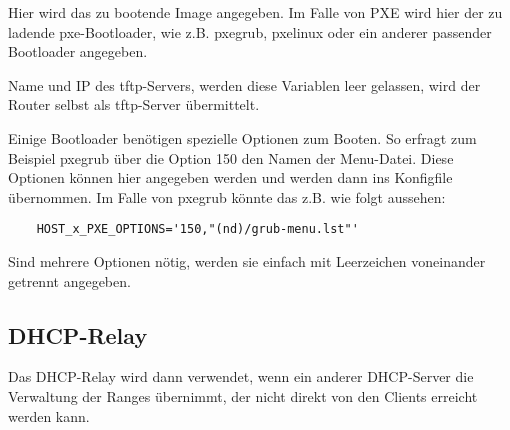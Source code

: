   \begin{description}


    Hier wird das zu bootende Image angegeben. Im Falle von PXE wird
    hier der zu ladende pxe-Bootloader, wie z.B. pxegrub, pxelinux
    oder ein anderer passender Bootloader angegeben.

    Name und IP des tftp-Servers, werden diese Variablen leer
    gelassen, wird der Router selbst als tftp-Server übermittelt.


    Einige Bootloader benötigen spezielle Optionen zum Booten. So
    erfragt zum Beispiel pxegrub über die Option 150 den Namen der
    Menu-Datei. Diese Optionen können hier angegeben werden und werden
    dann ins Konfigfile übernommen. Im Falle von pxegrub könnte das
    z.B. wie folgt aussehen:\\
    \begin{example}
      \begin{verbatim}
	HOST_x_PXE_OPTIONS='150,"(nd)/grub-menu.lst"'
      \end{verbatim}
    \end{example}

    Sind mehrere Optionen nötig, werden sie einfach mit Leerzeichen
    voneinander getrennt angegeben.

  \end{description}

\subsection {DHCP-Relay}

Das DHCP-Relay wird dann verwendet, wenn ein anderer DHCP-Server die Verwaltung
der Ranges übernimmt, der nicht direkt von den Clients erreicht werden kann.

